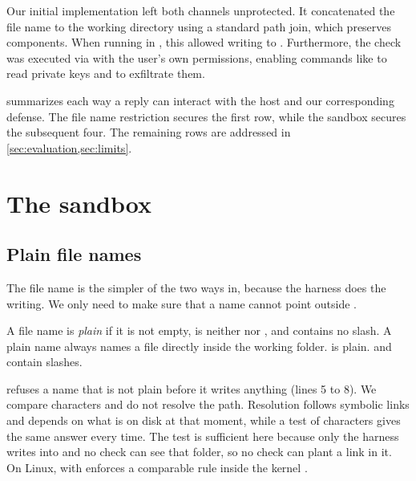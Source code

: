 \documentclass[10pt,twocolumn,a4paper]{article}
\begin{document}
Our initial implementation left both channels unprotected. It concatenated the file name to the working directory using a standard path join, which preserves  components. When running in , this allowed writing  to . Furthermore, the check was executed via  with the user's own permissions, enabling commands like  to read private keys and  to exfiltrate them.



 summarizes each way a reply can interact with the host and our corresponding defense. The file name restriction secures the first row, while the sandbox secures the subsequent four. The remaining rows are addressed in \cref{sec:evaluation,sec:limits}.

\section{The sandbox}
\label{sec:sandbox}

\subsection{Plain file names}

The file name is the simpler of the two ways in, because the harness does the writing. We only
need to make sure that a name cannot point outside .

\begin{definition}\label{def:plain}
A file name is \emph{plain} if it is not empty, is neither  nor , and contains
no slash. A plain name always names a file directly inside the working folder.
\example {} is plain.  and  contain slashes.
\end{definition}



 refuses a name that is not plain before it writes anything (lines 5 to 8). We
compare characters and do not resolve the path. Resolution follows symbolic links and depends on
what is on disk at that moment, while a test of characters gives the same answer every time. The
test is sufficient here because only the harness writes into  and no check can see
that folder, so no check can plant a link in it. On Linux,  with
 enforces a comparable rule inside the kernel \cite{openat2}.
\end{document}
